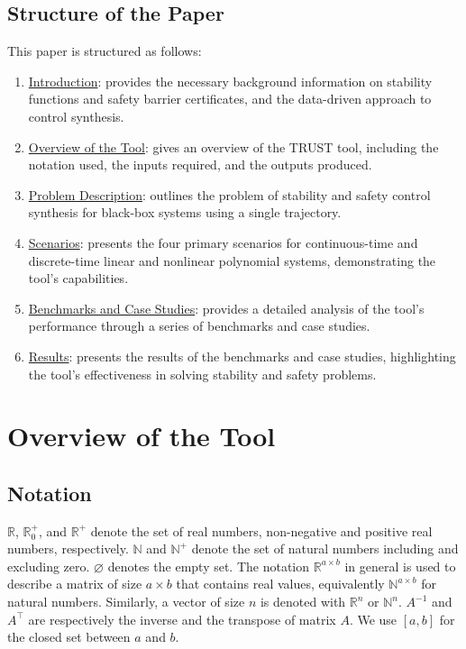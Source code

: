 \documentclass[sigconf]{acmart}
\renewcommand{\emptyset}{{\varnothing}}
\begin{document}
\subsection{Structure of the Paper}\label{subsec:structure-of-the-paper}
This paper is structured as follows:
\begin{enumerate}
\item \hyperref[sec:introduction]{Introduction}: provides the necessary background information on stability functions and safety barrier certificates, and the data-driven approach to control synthesis.
\item \hyperref[sec:overview-of-the-tool]{Overview of the Tool}: gives an overview of the TRUST tool, including the notation used, the inputs required, and the outputs produced.
\item \hyperref[sec:problem-description]{Problem Description}: outlines the problem of stability and safety control synthesis for black-box systems using a single trajectory.
\item \hyperref[sec:scenarios]{Scenarios}: presents the four primary scenarios for continuous-time and discrete-time linear and nonlinear polynomial systems, demonstrating the tool's capabilities.
\item \hyperref[sec:benchmarks-and-case-studies]{Benchmarks and Case Studies}: provides a detailed analysis of the tool's performance through a series of benchmarks and case studies.
\item \hyperref[sec:results]{Results}: presents the results of the benchmarks and case studies, highlighting the tool's effectiveness in solving stability and safety problems.
\end{enumerate}


\section{Overview of the Tool}\label{sec:overview-of-the-tool}

\subsection{Notation}\label{subsec:notation}
$\mathbb{R}$, $\mathbb{R}^+_0$, and $\mathbb{R}^+$ denote the set of real numbers, non-negative and positive real numbers, respectively. $\mathbb{N}$ and $\mathbb{N}^+$ denote the set of natural numbers including and excluding zero. $\emptyset$ denotes the empty set.
The notation $\mathbb{R}^{a\times b}$ in general is used to describe a matrix of size $a\times b$ that contains real values, equivalently $\mathbb{N}^{a\times b}$ for natural numbers.
Similarly, a vector of size $n$ is denoted with $\mathbb{R}^n$ or $\mathbb{N}^n$. $A^{-1}$ and $A^\top$ are respectively the inverse and the transpose of matrix $A$.
We use $[a,b]$ for the closed set between $a$ and $b$.
\end{document}
